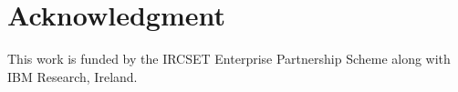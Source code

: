 \documentclass[conference]{IEEEtran}
\begin{document}
%





\section*{Acknowledgment}
This work is funded by the IRCSET Enterprise Partnership Scheme along with IBM Research, Ireland.



%
%
%
\begin{thebibliography}{1}

\end{thebibliography}


\end{document}
